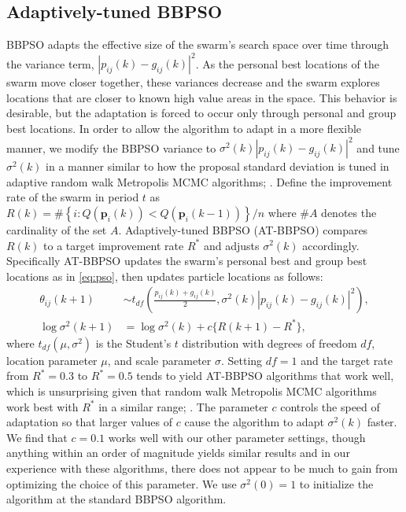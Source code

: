 \documentclass[cmbright]{staauth}
\begin{document}
\subsection{Adaptively-tuned BBPSO}\label{subsec:ATBBPSO}
BBPSO adapts the effective size of the swarm's search space over time through the variance term, $|p_{ij}(k) - g_{ij}(k)|^2$. As the personal best locations of the swarm move closer together, these variances decrease and the swarm explores locations that are closer to known high value areas in the space. This behavior is desirable, but the adaptation is forced to occur only through personal and group best locations. In order to allow the algorithm to adapt in a more flexible manner, we modify the BBPSO variance to $\sigma^2(k)|p_{ij}(k) - g_{ij}(k)|^2$ and tune $\sigma^2(k)$ in a manner similar to how the proposal standard deviation is tuned in adaptive random walk Metropolis MCMC algorithms; \cite{andrieu2008tutorial}. Define the improvement rate of the swarm in period $t$ as $R(k) = \#\left\{i:Q(\bm{p}_i(k)) < Q(\bm{p}_i(k-1))\right\}/n$ where $\#A$ denotes the cardinality of the set $A$. Adaptively-tuned BBPSO (AT-BBPSO) compares $R(k)$ to a target improvement rate $R^*$ and adjusts $\sigma^2(k)$ accordingly. Specifically AT-BBPSO updates the swarm's personal best and group best locations as in \eqref{eq:pso}, then updates particle locations as follows:
\begin{align}\label{eq:at-bbpso}
\theta_{ij}(k+1) &\sim t_{df}\left(\frac{p_{ij}(k) + g_{ij}(k)}{2}, \sigma^2(k)|p_{ij}(k) - g_{ij}(k)|^2\right),\nonumber\\
\log \sigma^2(k+1) &= \log\sigma^2(k) + c\{R(k+1) - R^*\},
\end{align}
where $t_{df}(\mu, \sigma^2)$ is the Student's $t$ distribution with degrees of freedom $df$, location parameter $\mu$, and scale parameter $\sigma$. Setting $df=1$ and the target rate from $R^*=0.3$ to $R^*=0.5$ tends to yield AT-BBPSO algorithms that work well, which is unsurprising given that random walk Metropolis MCMC algorithms work best with $R^*$ in a similar range; \cite{gelman1996efficient}. The parameter $c$ controls the speed of adaptation so that larger values of $c$ cause the algorithm to adapt $\sigma^2(k)$ faster. We find that $c=0.1$ works well with our other parameter settings, though anything within an order of magnitude yields similar results and in our experience with these algorithms, there does not appear to be much to gain from optimizing the choice of this parameter. We use $\sigma^2(0)=1$ to initialize the algorithm at the standard BBPSO algorithm. 
\end{document}
